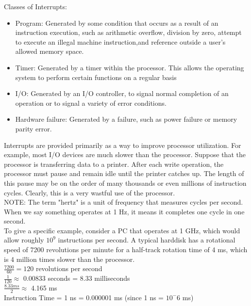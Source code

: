 \documentclass{article}
\begin{document}
Classes of Interrupts:
\begin{itemize}
\item Program: Generated by some condition that occurs as a result of an instruction execution, such as arithmetic overflow, division by zero, attempt to execute an illegal machine instruction,and reference outside a user's allowed memory space.
\item Timer: Generated by a timer within the processor. This allows the operating system to perform certain functions on a regular basis
\item I/O: Generated by an I/O controller, to signal normal completion of an operation or to signal a variety of error conditions.
\item Hardware failure: Generated by a failure, such as power failure or memory parity error.
\end{itemize}

Interrupts are provided primarily as a way to improve processor utilization. For example, most I/O devices are much slower than the processor. Suppose that the processor is transferring data to a printer. After each write operation, the processor must pause and remain idle until the printer catches up. The length of this pause may be on the order of many thousands or even millions of instruction cycles. Clearly, this is a very wastful use of the processor.\\

NOTE: The term "hertz" is a unit of frequency that measures cycles per second. When we say something operates at 1 Hz, it means it completes one cycle in one second.\\

To give a specific example, consider a PC that operates at 1 GHz, which would allow roughly $10^9$ instructions per second. A typical harddisk has a rotational speed of 7200 revolutions per minute for a half-track rotation time of 4 ms, which is 4 million times slower than the processor.\\


$\frac{7200}{60} = 120$ revolutions per second\\

$\frac{1}{120} \approx$ 0.00833 seconds = 8.33 milliseconds\\

$\frac{8.33 ms}{2} \approx$ 4.165 ms\\

Instruction Time = 1 ns = 0.000001 ms (since 1 ns = $10^-6$ ms)\\
\end{document}
